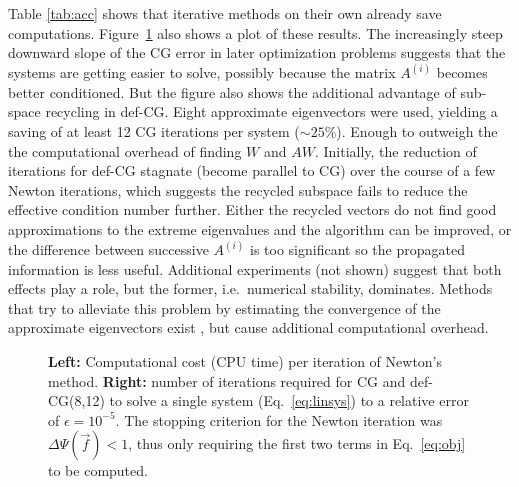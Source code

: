 \documentclass{article}
\newlength{\figheight}
\newlength{\figwidth}
\begin{document}
Table \ref{tab:acc} shows that iterative methods on their own already save computations. Figure~\ref{fig:results} also shows a plot of these results. The increasingly steep downward slope of the CG error in later optimization problems suggests that the systems are getting easier to solve, possibly because the matrix $A^{(i)}$ becomes better conditioned. But the figure also shows the additional advantage of sub-space recycling in def-CG. Eight approximate eigenvectors were used, yielding a saving of at least 12 CG iterations per system ($\sim 25\%$). Enough to outweigh the the computational overhead of finding $W$ and $AW$. Initially, the reduction of iterations for def-CG stagnate (become parallel to CG) over the course of a few Newton iterations, which suggests the recycled subspace fails to reduce the effective condition number further. Either the recycled vectors do not find good approximations to the extreme eigenvalues and the algorithm can be improved, or the difference between successive $A^{(i)}$ is too significant so the propagated information is less useful. Additional experiments (not shown) suggest that both effects play a role, but the former, i.e.~numerical stability, dominates. %
Methods that try to alleviate this problem by estimating the convergence of the approximate eigenvectors exist \cite{gosselet13}, but cause additional computational overhead.

\setlength{\figwidth}{.5\textwidth}
\setlength{\figheight}{0.61803398875\figwidth}

\begin{figure}[t]
    \centering \scriptsize
        \hfill\hfill%
        \hfill\null
    \caption{\textbf{Left:} Computational cost (CPU time) per iteration of Newton's method. \textbf{Right:} number of iterations required for CG and def-CG(8,12) to solve a single system (Eq.~\eqref{eq:linsys}) to a relative error of $\epsilon=10^{-5}$. The stopping criterion for the Newton iteration was $\Delta \Psi(\vec{f}) < 1$, thus only requiring the first two terms in Eq.~\eqref{eq:obj} to be computed.}\label{fig:results}
\end{figure}
\setlength{\figwidth}{.9\textwidth}
\end{document}
